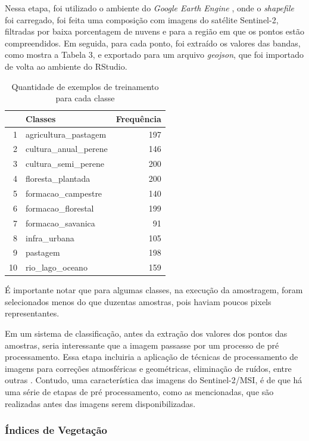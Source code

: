     Nessa etapa, foi utilizado o ambiente do \textit{Google Earth Engine} \cite{gorelick2017google} , onde o \emph{shapefile} foi carregado, foi feita uma composição com imagens do satélite Sentinel-2, filtradas por baixa porcentagem de nuvens e para a região em que os pontos estão compreendidos. Em seguida, para cada ponto, foi extraído os valores das bandas, como mostra a Tabela 3, e exportado para um arquivo \emph{geojson}, que foi importado de volta ao ambiente do RStudio.
    
\begin{table}[H]
    \label{tab.freq}
    \caption{Quantidade de exemplos de treinamento para cada classe}
  	\centering
  	\begin{tabular}{rlr}
    	\hline
   		& Classes & Frequência \\ 
    	\hline
  	1 & agricultura\_pastagem & 197 \\ 
    2 & cultura\_anual\_perene & 146 \\ 
    3 & cultura\_semi\_perene & 200 \\ 
    4 & floresta\_plantada & 200 \\ 
    5 & formacao\_campestre & 140 \\ 
    6 & formacao\_florestal & 199 \\ 
    7 & formacao\_savanica &  91 \\ 
    8 & infra\_urbana & 105 \\ 
    9 & pastagem & 198 \\ 
    10 & rio\_lago\_oceano & 159 \\ 
    	\hline
	\end{tabular}
\end{table}

É importante notar que para algumas classes, na execução da amostragem, foram selecionados menos do que duzentas amostras, pois haviam poucos pixels representantes. 

    Em um sistema de classificação, antes da extração dos valores dos pontos das amostras, seria interessante que a imagem passasse por um
processo de pré processamento. Essa etapa incluiria a aplicação de
técnicas de processamento de imagens para correções atmosféricas e
geométricas, eliminação de ruídos, entre outras \cite{lu-weng}. Contudo, uma característica das imagens do Sentinel-2/MSI, é de que há uma série de etapas de pré processamento, como as mencionadas, que são realizadas antes das imagens serem disponibilizadas. 

\subsubsection{Índices de
Vegetação}\label{indices-de-vegetacao}

